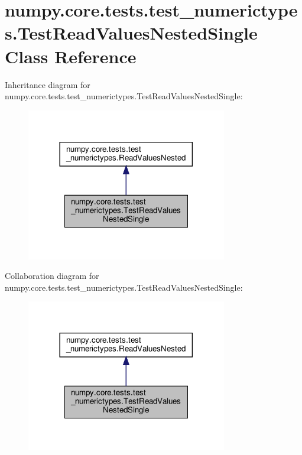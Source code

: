 \hypertarget{classnumpy_1_1core_1_1tests_1_1test__numerictypes_1_1TestReadValuesNestedSingle}{}\section{numpy.\+core.\+tests.\+test\+\_\+numerictypes.\+Test\+Read\+Values\+Nested\+Single Class Reference}
\label{classnumpy_1_1core_1_1tests_1_1test__numerictypes_1_1TestReadValuesNestedSingle}


Inheritance diagram for numpy.\+core.\+tests.\+test\+\_\+numerictypes.\+Test\+Read\+Values\+Nested\+Single\+:
\nopagebreak
\begin{figure}[H]
\begin{center}
\leavevmode
\includegraphics[width=248pt]{classnumpy_1_1core_1_1tests_1_1test__numerictypes_1_1TestReadValuesNestedSingle__inherit__graph}
\end{center}
\end{figure}


Collaboration diagram for numpy.\+core.\+tests.\+test\+\_\+numerictypes.\+Test\+Read\+Values\+Nested\+Single\+:
\nopagebreak
\begin{figure}[H]
\begin{center}
\leavevmode
\includegraphics[width=248pt]{classnumpy_1_1core_1_1tests_1_1test__numerictypes_1_1TestReadValuesNestedSingle__coll__graph}
\end{center}
\end{figure}
